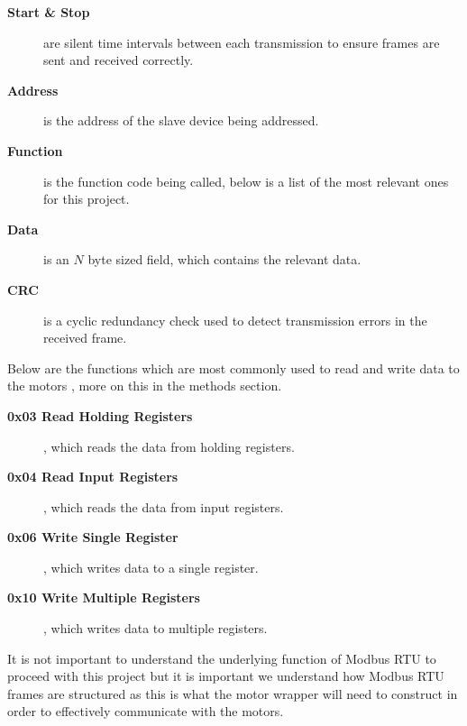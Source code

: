 \begin{description}
    \item[\textbf{Start \& Stop}] are silent time intervals between each transmission to ensure frames are sent and received correctly.
    \item[\textbf{Address}] is the address of the slave device being addressed.
    \item[\textbf{Function}] is the function code being called, below is a list of the most relevant ones for this project.
    \item[\textbf{Data}] is an \(N\) byte sized field, which contains the relevant data.
    \item[\textbf{CRC}] is a cyclic redundancy check used to detect transmission errors in the received frame.
\end{description}

Below are the functions which are most commonly used to read and write data to the motors \cite{ModbusApplicationProtocol}, more on this in the methods section.

\begin{description}
    \item[\textbf{0x03 Read Holding Registers}], which reads the data from holding registers.
    \item[\textbf{0x04 Read Input Registers}], which reads the data from input registers.
    \item[\textbf{0x06 Write Single Register}], which writes data to a single register.
    \item[\textbf{0x10 Write Multiple Registers}], which writes data to multiple registers. 
\end{description}
It is not important to understand the underlying function of Modbus RTU to proceed with this project but it is important we understand how Modbus RTU frames are structured as this is what the motor wrapper will need to construct in order to effectively communicate with the motors.



